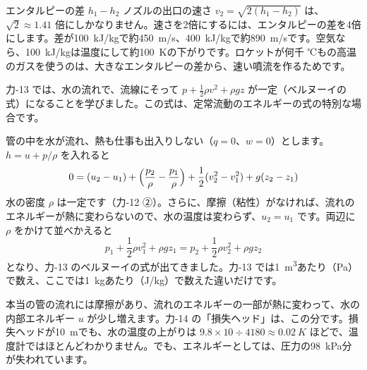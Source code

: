 \begin{phbaisuru}{エンタルピーの差 $h_1-h_2$}
ノズルの出口の速さ $v_2=\sqrt{2(h_1-h_2)}$ は、$\sqrt2\approx1.41$ 倍にしかなりません。速さを2倍にするには、エンタルピーの差を4倍にします。差が\qty{100}{kJ/kg}で約\qty{450}{m/s}、\qty{400}{kJ/kg}で約\qty{890}{m/s}です。空気なら、\qty{100}{kJ/kg}は温度にして約\qty{100}{K}の下がりです。ロケットが何千 ℃もの高温のガスを使うのは、大きなエンタルピーの差から、速い噴流を作るためです。
\end{phbaisuru}


\leavevmode\label{ph:熱-4:sec4}力-13 では、水の流れで、流線にそって $p+\tfrac12\rho v^2+\rho gz$ が一定（ベルヌーイの式）になることを学びました。この式は、定常流動のエネルギーの式の特別な場合です。

管の中を水が流れ、熱も仕事も出入りしない（$q=0$、$w=0$）とします。$h=u+p/\rho$ を入れると
\[ 0=(u_2-u_1)+\Bigl(\frac{p_2}{\rho}-\frac{p_1}{\rho}\Bigr)+\frac12(v_2^2-v_1^2)+g(z_2-z_1) \]
水の密度 $\rho$ は一定です（力-12 ②）。さらに、摩擦（粘性）がなければ、流れのエネルギーが熱に変わらないので、水の温度は変わらず、$u_2=u_1$ です。両辺に $\rho$ をかけて並べかえると
\[ p_1+\frac12\rho v_1^2+\rho gz_1=p_2+\frac12\rho v_2^2+\rho gz_2 \]
となり、力-13 のベルヌーイの式が出てきました。力-13 では\qty{1}{m^3}あたり（Pa）で数え、ここでは\qty{1}{kg}あたり（J/kg）で数えた違いだけです。

\begin{phflow}
\end{phflow}

\begin{seikaku}
本当の管の流れには摩擦があり、流れのエネルギーの一部が熱に変わって、水の内部エネルギー $u$ が少し増えます。力-14 の「損失ヘッド」は、この分です。損失ヘッドが\qty{10}{m}でも、水の温度の上がりは $9.8\times10\div4180\approx\qty{0.02}{K}$ ほどで、温度計ではほとんどわかりません。でも、エネルギーとしては、圧力の\qty{98}{kPa}分が失われています。
\end{seikaku}


